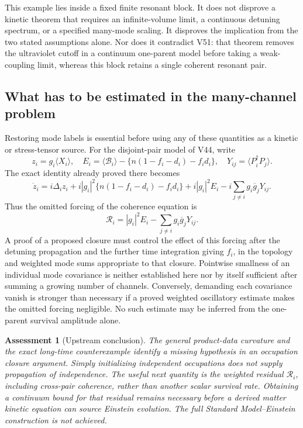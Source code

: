 \documentclass[11pt]{article}
\newtheorem{assessment}[theorem]{Assessment}
\theoremstyle{remark}
\begin{document}
This example lies inside a fixed finite resonant block.
It does not disprove a kinetic theorem that requires an
infinite-volume limit, a continuous detuning spectrum, or
a specified many-mode scaling.  It disproves the implication
from the two stated assumptions alone.  Nor does it contradict
V51: that theorem removes the ultraviolet cutoff in a continuum
one-parent model before taking a weak-coupling limit, whereas
this block retains a single coherent resonant pair.

\subsection{What has to be estimated in the many-channel problem}

Restoring mode labels is essential before using any of these
quantities as a kinetic or stress-tensor source.  For the
disjoint-pair model of V44, write
\[
 z_i=g_i\langle X_i\rangle,\quad
 E_i=\langle\mathcal B_i\rangle-
      \{n(1-f_i-d_i)-f_id_i\},\quad
 Y_{ij}=\langle P_i^\dagger P_j\rangle .
\]
The exact identity already proved there becomes
\[
 \dot z_i=i\Delta_i z_i
 +i|g_i|^2\{n(1-f_i-d_i)-f_id_i\}
 +i|g_i|^2E_i-i\sum_{j\ne i}g_i\overline g_jY_{ij}.
\]
Thus the omitted forcing of the coherence equation is
\[
 \mathcal R_i=|g_i|^2E_i-
                \sum_{j\ne i}g_i\overline g_jY_{ij}.
\]
A proof of a proposed closure must control the effect of this
forcing after the detuning propagation and the further time
integration giving \(f_i\), in the topology and weighted
mode sums appropriate to that closure.  Pointwise smallness
of an individual mode covariance is neither established
here nor by itself sufficient after summing a growing
number of channels.  Conversely, demanding each covariance
vanish is stronger than necessary if a proved weighted
oscillatory estimate makes the omitted forcing negligible.
No such estimate may be inferred from the one-parent
survival amplitude alone.

\begin{assessment}[Upstream conclusion]
\label{ass:v20v54}
The general product-data curvature and the exact long-time
counterexample identify a missing hypothesis in an occupation
closure argument.  Simply initializing independent occupations
does not supply propagation of independence.  The useful next
quantity is the weighted residual \(\mathcal R_i\), including
cross-pair coherence, rather than another scalar survival rate.
Obtaining a continuum bound for that residual remains necessary
before a derived matter kinetic equation can source Einstein
evolution.  The full Standard Model--Einstein construction
is not achieved.
\end{assessment}
\end{document}
